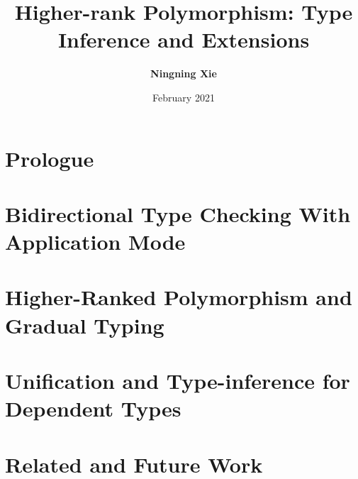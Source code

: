 

\title{Higher-rank Polymorphism: Type Inference and Extensions}
\author{\textbf{Ningning Xie}}
\date{February 2021}




\maketitle

\begin{abstract}
 
\end{abstract}


\frontmatter
\makedeclaration
\makeAck
\tableofcontents
\listoffigures
\listoftables

\mainmatter

\part{Prologue}





\part{Bidirectional Type Checking With Application Mode} \label{part:typeinference}



\part{Higher-Ranked Polymorphism and Gradual Typing}
\label{part:gradual}



\part{Unification and Type-inference for Dependent Types} \label{part:dependentTypes}






\part{Related and Future Work}

